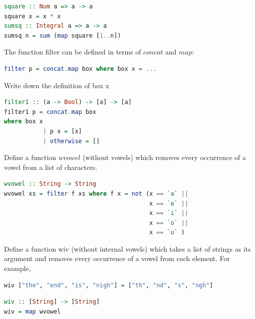 \documentclass{article}
\begin{document}
\begin{solution}
\begin{lstlisting}[language=Haskell]
square :: Num a => a -> a
square x = x * x
sumsq :: Integral a => a -> a
sumsq n = sum (map square [1..n])
\end{lstlisting}
\end{solution}

\begin{exercise} 
The function filter can be defined in terms of $concat$ and $map$:
\begin{lstlisting}[language=Haskell]
filter p = concat.map box where box x = ...
\end{lstlisting}
Write down the definition of box x   
\end{exercise} 

\begin{solution}
\begin{lstlisting}[language=Haskell]
filter1 :: (a -> Bool) -> [a] -> [a]
filter1 p = concat.map box
where box x
           | p x = [x]
           | otherwise = []
\end{lstlisting}
\end{solution}
\pagebreak
\begin{exercise} 
Define a function $wvowel$ (without vowels) which removes every occurrence of a
vowel from a list of characters.
\end{exercise} 

\begin{solution}
\begin{lstlisting}[language=Haskell]
wvowel :: String -> String
wvowel xs = filter f xs where f x = not (x == `a` ||
                                         x == `e` ||
                                         x == `i` ||
                                         x == `o` ||
                                         x == `u` )
\end{lstlisting}
\end{solution}

\begin{exercise} 
 Define a function wiv (without internal vowels) which takes a list of strings as its
argument and removes every occurrence of a vowel from each element. For example, 
\begin{lstlisting}[language=Haskell]
wiv ["the", "end", "is", "nigh"] = ["th", "nd", "s", "ngh"] 
\end{lstlisting}
\end{exercise} 

\begin{solution}
\begin{lstlisting}[language=Haskell]
wiv :: [String] -> [String]
wiv = map wvowel
\end{lstlisting}
\end{solution}
\end{document}
